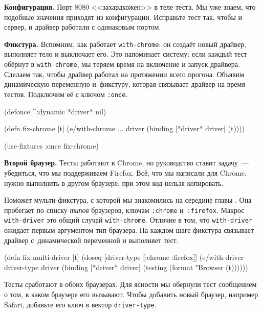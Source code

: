 \textbf{Конфигурация.} Порт 8080 <<захардкожен>> в теле теста. Мы уже знаем, что
подобные значения приходят из конфигурации. Исправьте тест так, чтобы и сервер,
и драйвер работали с одинаковым портом.


\textbf{Фикстура.} Вспомним, как работает \verb|with-chrome|: он создаёт новый
драйвер, выполняет тело и выключает его. Это напоминает систему: если каждый
тест обёрнут в \verb|with-chrome|, мы теряем время на включение и запуск
драйвера. Сделаем так, чтобы драйвер работал на протяжении всего
прогона. Объявим динамическую переменную и~фикстуру, которая связывает драйвер
на время тестов. Подключим её с ключом \verb|:once|.

\begin{english}
  \begin{clojure}
(defonce ^:dynamic *driver* nil)

(defn fix-chrome [t]
  (e/with-chrome {...} driver
    (binding [*driver* driver]
      (t))))

(use-fixtures :once fix-chrome)
  \end{clojure}
\end{english}

\textbf{Второй браузер.} Тесты работают в Chrome, но руководство ставит
задачу~--- убедиться, что мы поддерживаем Firefox. Всё, что мы написали для
Chrome, нужно выполнить в другом браузере, при этом код нельзя копировать.

Поможет мульти-фикстура, с которой мы знакомились на середине
главы . Она пробегает по списку \emph{типов} браузеров,
ключам \verb|:chrome| и~\verb|:firefox|. Макрос \verb|with-driver| это общий
случай \verb|with-chrome|. Отличие в том, что \verb|with-driver| ожидает первым
аргументом тип браузера. На каждом шаге фикстура связывает драйвер
с~динамической переменной и выполняет тест.

\begin{english}
  \begin{clojure}
(defn fix-multi-driver [t]
  (doseq [driver-type [:chrome :firefox]]
    (e/with-driver driver-type {} driver
      (binding [*driver* driver]
        (testing (format "Browser %
          (t))))))
  \end{clojure}
\end{english}

Тесты сработают в обоих браузерах. Для ясности мы обернули тест сообщением о
том, в каком браузере его вызывают. Чтобы добавить новый браузер, например
Safari, добавьте его ключ в вектор \verb|driver-type|.


